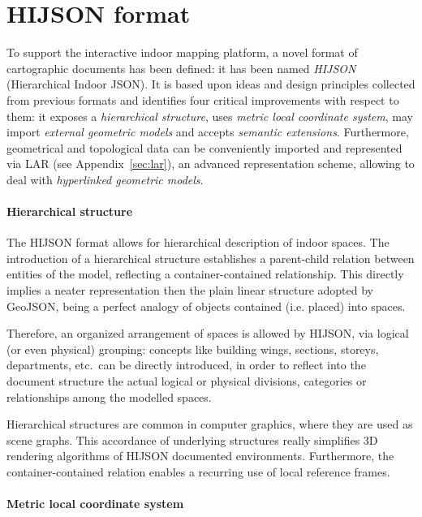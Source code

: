 \section{HIJSON format}\label{hijson}

To support the interactive indoor mapping platform, a novel format of
cartographic documents has been defined: it has been named \emph{HIJSON}
(Hierarchical Indoor JSON). It is based upon ideas and design principles
collected from previous formats and identifies four critical improvements with
respect to them: it exposes a \emph{hierarchical structure}, uses \emph{metric
local coordinate system}, may import \emph{external geometric models} and
accepts \emph{semantic extensions}. Furthermore, geometrical  and topological
data can be conveniently imported and represented via LAR (see Appendix~\ref{sec:lar}), an
advanced representation scheme, allowing to deal with \emph{hyperlinked
geometric models}.



\paragraph*{Hierarchical structure}\label{hierarchical-structure}

The HIJSON format allows for hierarchical description of indoor spaces. The
introduction of a hierarchical structure establishes a parent-child relation
between entities of the model, reflecting a container-contained relationship.
This directly implies a neater representation then the plain linear structure
adopted by GeoJSON, being a perfect analogy of objects contained (i.e.
placed) into spaces.

Therefore, an organized arrangement of spaces is allowed by HIJSON, via
logical (or even physical) grouping: concepts like building wings, sections,
storeys, departments, etc.~can be directly introduced, in order to reflect
into the document structure the actual logical or physical divisions,
categories or relationships among the modelled spaces.

Hierarchical structures are common in computer graphics, where they are used
as scene graphs. This accordance of underlying structures really simplifies 3D
rendering algorithms of HIJSON documented environments. Furthermore, the
container-contained relation enables a recurring use of local reference
frames.

\paragraph*{Metric local coordinate system}\label{metric-local-coordinate-system}

